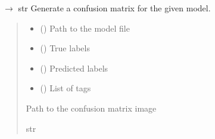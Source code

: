 \documentclass[letterpaper,10pt,english]{sphinxmanual}
\begin{document}
\begin{fulllineitems}
\label{\detokenize{autoapi/src/LSTMTrainer/index:src.LSTMTrainer.confusion_matrix}}
\pysigstartsignatures
\pysiglinewithargsret
{}
{\sphinxparamcomma {}\sphinxparamcomma {}\sphinxparamcomma {}}
{{ $\rightarrow$ str}}
\pysigstopsignatures
\sphinxAtStartPar
Generate a confusion matrix for the given model.
\begin{quote}\begin{description}
\begin{itemize}
\item {} 
\sphinxAtStartPar
{} () \textendash{} Path to the model file

\item {} 
\sphinxAtStartPar
{} () \textendash{} True labels

\item {} 
\sphinxAtStartPar
{} () \textendash{} Predicted labels

\item {} 
\sphinxAtStartPar
{} (\sphinxstyleliteralemphasis{\sphinxupquote{{[}}}\sphinxstyleliteralemphasis{\sphinxupquote{{]}}}) \textendash{} List of tags

\end{itemize}

\sphinxAtStartPar
Path to the confusion matrix image

\sphinxAtStartPar
str

\end{description}\end{quote}

\end{fulllineitems}
\end{document}
